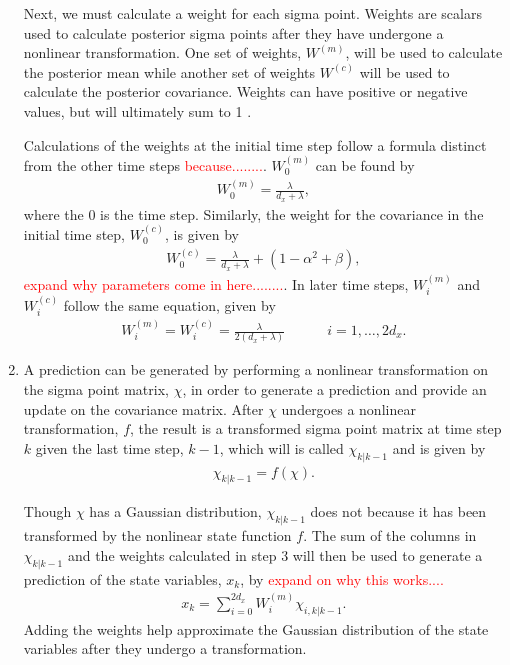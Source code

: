 \begin{enumerate}
        
\noindent Next, we must calculate a weight for each sigma point. Weights are scalars used to calculate posterior sigma points after they have undergone a nonlinear transformation. One set of weights,  $W^{(m)}$, will be used to calculate the posterior mean while another set of weights $W^{(c)}$ will be used to calculate the posterior covariance. Weights can have positive or negative values, but will ultimately sum to 1 \cite{article6}.
        
        Calculations of the weights at the initial time step follow a formula distinct from the other time steps
         \textcolor{red}{because........}. $W^{(m)}_{0} $ can be found by
            \begin{align*}
        W^{(m)}_{0} = \frac{\lambda}{d_{x}+ \lambda} ,
         \end{align*}
         where the 0 is the time step. Similarly, the weight for the covariance in the initial time step, $W^{(c)}_{0}$, is given by
        \begin{align*}
        W^{(c)}_{0} = \frac{\lambda}{d_{x}+ \lambda} + (1 - \alpha^{2} + \beta) ,
         \end{align*}
          \textcolor{red}{expand why parameters come in here........}. In later time steps, $W^{(m)}_{i} $ and$ W^{(c)}_{i}$ follow the same equation, given by
               \begin{align*}
        W^{(m)}_{i} = W^{(c)}_{i} = \frac{\lambda}{2(d_{x}+ \lambda) } \quad \quad \quad i=1,\dots,2d_{x}.
            \end{align*}
           
          
           
        \item A prediction can be generated by performing a nonlinear transformation on the sigma point matrix, $\chi$, in order to generate a prediction and provide an update on the covariance matrix. After $\chi$ undergoes a nonlinear transformation, $f$, the result is a transformed sigma point matrix at time step $k$ given the last time step, $k-1$, which will is called $\chi_{k | k - 1}$ and is given by
        \begin{align*}
        \chi_{k | k - 1} = f(\chi).
        \end{align*}
        
        
        Though $\chi$ has a Gaussian distribution,  $ \chi_{k | k - 1} $ does not because it has been transformed by the nonlinear state function $f$. The sum of the columns in $ \chi_{k | k - 1} $ and the weights calculated in step 3 will then be used to generate a prediction of the state variables, $x_k$, by 
        \textcolor{red}{expand on why this works....}
        \begin{align*}
         x_{k} = \sum^{2d_x}_{i = 0} W_i^{(m)} \chi_{i, k | k - 1}.
        \end{align*}
       Adding the weights help approximate the Gaussian distribution of the state variables after they undergo a transformation. 
       

\end{enumerate}
